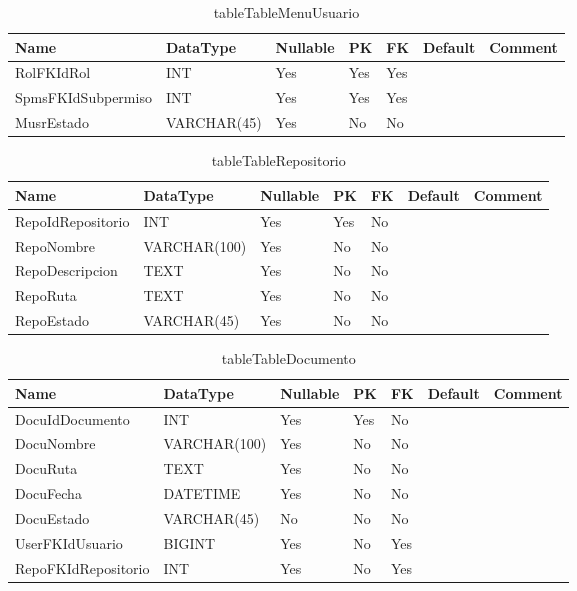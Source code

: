 \begin{table}
	\caption{tableTableMenuUsuario}
	\label{labelTableMenuUsuario}
	\begin{tabular}{ |l|l|l|l|l|l|l| }
		\hline
		Name & DataType & Nullable & PK & FK & Default & Comment \\ \hline
		RolFKIdRol & INT & Yes & Yes & Yes &  & \\ \hline 
		SpmsFKIdSubpermiso & INT & Yes & Yes & Yes &  & \\ \hline 
		MusrEstado & VARCHAR(45) & Yes & No & No &  & \\ \hline 
		
	\end{tabular}
\end{table}


\begin{table}
	\caption{tableTableRepositorio}
	\label{labelTableRepositorio}
	\begin{tabular}{ |l|l|l|l|l|l|l| }
		\hline
		Name & DataType & Nullable & PK & FK & Default & Comment \\ \hline
		RepoIdRepositorio & INT & Yes & Yes & No &  & \\ \hline 
		RepoNombre & VARCHAR(100) & Yes & No & No &  & \\ \hline 
		RepoDescripcion & TEXT & Yes & No & No &  & \\ \hline 
		RepoRuta & TEXT & Yes & No & No &  & \\ \hline 
		RepoEstado & VARCHAR(45) & Yes & No & No &  & \\ \hline 
		
	\end{tabular}
\end{table}


\begin{table}
	\caption{tableTableDocumento}
	\label{labelTableDocumento}
	\begin{tabular}{ |l|l|l|l|l|l|l| }
		\hline
		Name & DataType & Nullable & PK & FK & Default & Comment \\ \hline
		DocuIdDocumento & INT & Yes & Yes & No &  & \\ \hline 
		DocuNombre & VARCHAR(100) & Yes & No & No &  & \\ \hline 
		DocuRuta & TEXT & Yes & No & No &  & \\ \hline 
		DocuFecha & DATETIME & Yes & No & No &  & \\ \hline 
		DocuEstado & VARCHAR(45) & No & No & No &  & \\ \hline 
		UserFKIdUsuario & BIGINT & Yes & No & Yes &  & \\ \hline 
		RepoFKIdRepositorio & INT & Yes & No & Yes &  & \\ \hline 
		
	\end{tabular}
\end{table}


